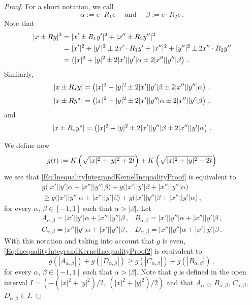 \begin{proof}
For a short notation, we call
$$
\alpha := e \cdot R_1 e  \quad \text{ and } \quad \beta := e \cdot R_2 e\,.
$$
Note that
\begin{align*}
|x \pm Ry|^2&= |x' \pm R_1y'|^2 + |x'' \pm R_2y''|^2 \\
&= |x'|^2 + |y'|^2 \pm 2 x'\cdot R_1 y' +  |x''|^2 + |y''|^2 \pm 2 x''\cdot R_2 y''\\
&= \left ( { |x|^2 + |y|^2 \pm 2 |x'||y'| \alpha \pm 2 |x''||y''| \beta}\right )\,.
\end{align*}
Similarly,
$$
|x \pm R_\star y| = \left ( { |x|^2 + |y|^2 \pm 2 |x'||y'| \beta \pm 2 |x''||y''|\alpha}\right )\,,
$$
$$
|x \pm R y^\star| = \left ( { |x|^2 + |y|^2 \pm 2 |x'||y''| \alpha \pm 2 |x''||y'|\beta}\right )\,,
$$
and
$$
|x \pm R_\star y^\star| = \left ( { |x|^2 + |y|^2 \pm 2 |x'||y''| \beta \pm 2 |x''||y'| \alpha}\right )\,.
$$

We define now
$$
g(t) := K \left ( {\sqrt{|x|^2 + |y|^2 + 2 t}}\right ) + K \left ( {\sqrt{|x|^2 + |y|^2 - 2 t}}\right )
$$
we see that \eqref{Eq:InequalityIntegrandKernelInequalityProof} is equivalent to
\begin{equation}
\label{Eq:InequalityIntegrandKernelInequalityProof2}
\begin{split}
g\Big(|x'||y'| \alpha + |x''||y''| \beta \Big)
+ g\Big(|x'||y'| \beta + |x''||y''| \alpha \Big) \hspace{2cm}
\\ \geq
g\Big(|x'||y''| \alpha + |x''||y'|\beta \Big)
+ g\Big(|x'||y''| \beta + |x''||y'| \alpha \Big)\,,
\end{split}
\end{equation}
for every $\alpha$, $\beta \in [-1,1]$ such that $\alpha > |\beta|$. Let
$$
\begin{array}{cc}
A_{\alpha,\beta} = |x'||y'|  \alpha + |x''||y''|\beta \,, &
B_{\alpha,\beta} = |x'||y''| \alpha + |x''||y'| \beta \,, \\
C_{\alpha,\beta} = |x''||y'| \alpha + |x'||y''| \beta \,, &
D_{\alpha,\beta} = |x''||y''|\alpha + |x'||y'|  \beta \,.
\end{array}
$$
With this notation and taking into account that $g$ is even,
\eqref{Eq:InequalityIntegrandKernelInequalityProof2} is equivalent to
\begin{equation}
\label{Eq:InequalityIntegrandKernelInequalityProof3}
g(|A_{\alpha,\beta}|) + g(|D_{\alpha,\beta}|) \geq g(|C_{\alpha,\beta}|) + g(|B_{\alpha,\beta}|)\,,
\end{equation}
for every $\alpha$, $\beta \in [-1,1]$ such that $\alpha > |\beta|$. Note that $g$ is defined in
the open interval $I = (-(|x|^2 + |y|^2)/2,\ (|x|^2 + |y|^2)/2)$ and that $A_{\alpha,\beta}$,
$B_{\alpha,\beta}$, $C_{\alpha,\beta}$, $D_{\alpha,\beta} \in I$.


\end{proof}
